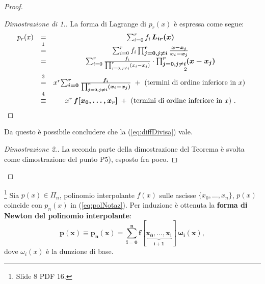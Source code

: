 \begin{proof}
\begin{proof}[Dimostrazione di 1.]
        La forma di Lagrange di $p_r(x)$ è espressa come segue:
        \begin{equation*}
            \begin{matrix}
                p_r(x) &=& \sum_{i=0}^r f_i\, \boldsymbol{L_{ir}(x)} \\
                &\overset{\footnotemark}{=}& \sum_{i=0}^r f_i\,\boldsymbol{\prod_{j=0, j\neq i}^r\frac{x-x_j}{x_i-x_j}} \\
                &=&\sum_{i=0}^r \frac{f_i}{\prod_{j=0, j\neq i}^r(x_i-x_j)}\cdot \underset{\footnotemark}{\boldsymbol{\prod_{j=0, j\neq i}^r(x-x_j)}} \\
                &\overset{\footnotemark}{=}& x^r\boldsymbol{\sum_{i=0}^r\frac{f_i}{\prod_{j=0, j\neq i}^r(x_i-x_j)}}\;+ \text{ (termini di ordine inferiore in $x$) }\\
                &\overset{\footnotemark}{\equiv}& x^r\, \boldsymbol{f[x_0,\hdots, x_r]}\; + \text{ (termini di ordine inferiore in $x$) }.
            \end{matrix}
        \end{equation*}
    \end{proof}
    \addtocounter{footnote}{-3}
    
    
    
    Da questo è possibile concludere che la (\ref{eq:diffDivisa}) vale.

    \begin{proof}[Dimostrazione 2.]
        La seconda parte della dimostrazione del Teorema è svolta come dimostrazione del punto P5), esposto fra poco.
    \end{proof}
\end{proof}

\begin{remark}\label{rem:formaNewton}\footnote{Slide 8 PDF 16.}
    Sia $p(x)\in\Pi_n$, polinomio interpolante $f(x)$ sulle ascisse $\{x_0,\hdots, x_n\}$, $p(x)$ coincide con $p_n(x)$ in (\ref{eq:polNotaz}).
    Per induzione è ottenuta la \textbf{forma di Newton del polinomio interpolante}: 
    \begin{equation}\label{eq:polInterNewt}
        \boldsymbol{p(x)\equiv p_n(x) = \sum_{i=0}^{n} f[\underbrace{x_0,\hdots, x_i}_{i+1}]\,\omega_i(x)},
    \end{equation}
    dove $\omega_i(x)$ è la dunzione di base.
\end{remark}

